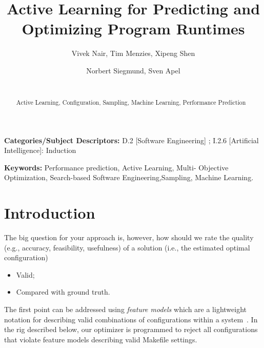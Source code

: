 \documentclass{sig-alternative}
\newcommand{\bi}{\begin{itemize}}%
\newcommand{\ei}{\end{itemize}}
\begin{document}
\title{Active Learning for Predicting and Optimizing Program Runtimes}
\author{
        \alignauthor Vivek Nair, Tim Menzies, Xipeng Shen 
    \and  
        \alignauthor Norbert Siegmund, Sven Apel \\
        \\
       }

\maketitle 
\thispagestyle{plain}
\pagestyle{plain}
\begin{abstract}
Active Learning, Configuration, Sampling, Machine Learning, Performance Prediction


\end{abstract}

\vspace{1mm}
\noindent
{\bf Categories/Subject Descriptors:} 
D.2 [Software Engineering] ;
I.2.6 [Artificial Intelligence]: Induction

 
\vspace{1mm}
\noindent

{\bf Keywords:} Performance prediction, Active Learning, 
Multi- Objective Optimization,
Search-based Software Engineering,Sampling, Machine Learning.

 

 
\section{Introduction}
The big question for your approach is, however, how should we rate the quality (e.g., accuracy, feasibility, usefulness) of a solution (i.e., the estimated optimal configuration) 
\bi
\item Valid;
\item Compared with ground truth.
\ei
The first point can be addressed using {\em feature models} which are a lightweight notation
for describing valid combinations of configurations within a  system~\cite{kang1990feature}. In the rig
described below, our optimizer is programmed to reject all configurations that violate
feature models describing valid Makefile settings.
\end{document}
